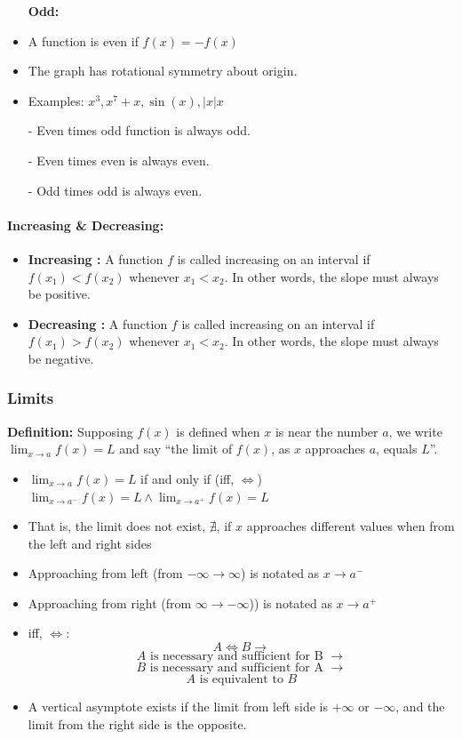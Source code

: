 \documentclass[12pt]{article}
\begin{document}
\begin{itemize}
    \item[] \textbf{Odd: }
    \item A function is even if $f(x) = -f(x)$
    \item The graph has rotational symmetry about origin.
    \item Examples: $x^3, x^{7}+x, \sin(x), |x|x$
\end{itemize}

\noindent\hrulefill

\begin{itemize}
    \item[-] Even times odd function is always odd.
    \item[-] Even times even is always even.
    \item[-] Odd times odd is always even.
\end{itemize}

\paragraph{Increasing \& Decreasing:}
\begin{itemize}
\item \textbf{Increasing :} A  function $f$ is called increasing on an interval if $f(x_1) < f(x_2)$ whenever $x_1 < x_2$. In other words, the slope must always be positive.
\item \textbf{Decreasing :} A  function $f$ is called increasing on an interval if $f(x_1) > f(x_2)$ whenever $x_1 < x_2$. In other words, the slope must always be negative.
\end{itemize}


\subsubsection{Limits}

\textbf{Definition: } Supposing $f(x)$ is defined when $x$ is near the number $a$, we write $\lim_{x\to a} f(x) = L$ and say ``the limit of $f(x)$, as $x$ approaches $a$, equals $L$''.


\begin{itemize}
    \item $\lim_{x\to a} f(x) = L$ if and only if (iff, $\iff$) $\lim_{x\to a^-} f(x) = L \wedge \lim_{x\to a^+} f(x) = L$
    \item That is, the limit does not exist, $\nexists$, if $x$ approaches different values when from the left and right sides 
    \item Approaching from left (from $-\infty \to \infty$) is notated as $x \to a^-$
    \item Approaching from right (from $\infty \to -\infty$)) is notated as $x \to a^+$
    \item iff, $\iff$:
        $$A \iff B \rightarrow{}$$
        $$A \text{ is necessary and sufficient for B }\rightarrow{}$$
        $$B \text{ is necessary and sufficient for A } \rightarrow{}$$
        $$A \text{ is equivalent to } B$$
    \item A vertical asymptote exists if the limit from left side is $+\infty$ or $-\infty$, and the limit from the right side is the opposite.
\end{itemize}
\end{document}
